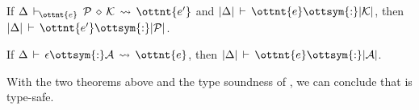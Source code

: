 \begin{theorem}
  If $ \Delta \,\vdash\, _{\!\!\!\! \ottnt{e} }\:\: \mathcal{P} \,\diamond\, \mathcal{K} \,\rightsquigarrow\, \ottnt{e'} $ and $|  \Delta  |  \,\vdash\,  \ottnt{e}  \ottsym{:}   | \mathcal{K} | $,
  then $|  \Delta  |  \,\vdash\,  \ottnt{e'}  \ottsym{:}  |  \mathcal{P}  |$.
\end{theorem}

\begin{theorem}
  If $\Delta  \,\vdash\,  \epsilon  \ottsym{:}  \mathcal{A}  \,\rightsquigarrow\,  \ottnt{e}$, then $|  \Delta  |  \,\vdash\,  \ottnt{e}  \ottsym{:}  |  \mathcal{A}  |$.
\end{theorem}

\noindent
With the two theorems above and the type soundness of \lambdaiu, we can
conclude that \uaena is type-safe.
